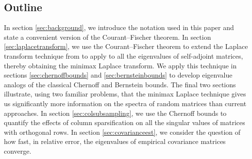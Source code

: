 \documentclass[11pt,letterpaper,twoside,reqno,nosumlimits]{amsart}
\theoremstyle{remark}
\numberwithin{equation}{section}
\numberwithin{thm}{section}
\numberwithin{prop}{section}
\numberwithin{defn}{section}
\numberwithin{remark}{section}
\begin{document}


\subsection{Outline}
In section \ref{sec:background}, we introduce the notation used in this paper and state a convenient version of the Courant--Fischer theorem. In section \ref{sec:laplacetransform}, we use the Courant--Fischer theorem to extend the Laplace transform technique from \cite{T10a} to apply to all the eigenvalues of self-adjoint matrices, thereby obtaining the minimax Laplace transform. We apply this technique in sections \ref{sec:chernoffbounds} and \ref{sec:bernsteinbounds} to develop eigenvalue analogs of the classical Chernoff and Bernstein bounds. The final two sections illustrate, using two familiar problems, that the minimax Laplace technique gives us significantly more information on the spectra of random matrices than current approaches. In section \ref{sec:colsubsampling}, we use the Chernoff bounds to quantify the effects of column sparsification on all the singular values of matrices with orthogonal rows. In section \ref{sec:covarianceest}, we consider the question of how fast, in relative error, the eigenvalues of empirical covariance matrices converge.
\end{document}
